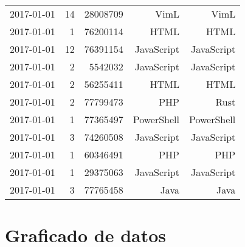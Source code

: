 \begin{table}[htp!]
\begin{tabular}{|r|r|r|r|r|}
		2017-01-01                          & 14                                 & 28008709                         & VimL                                           & VimL                                           \\
		2017-01-01                          & 1                                  & 76200114                         & HTML                                           & HTML                                           \\
		2017-01-01                          & 12                                 & 76391154                         & JavaScript                                     & JavaScript                                     \\
		2017-01-01                          & 2                                  & 5542032                          & JavaScript                                     & JavaScript                                     \\
		2017-01-01                          & 2                                  & 56255411                         & HTML                                           & HTML                                           \\
		2017-01-01                          & 2                                  & 77799473                         & PHP                                            & Rust                                           \\
		2017-01-01                          & 1                                  & 77365497                         & PowerShell                                     & PowerShell                                     \\
		2017-01-01                          & 3                                  & 74260508                         & JavaScript                                     & JavaScript                                     \\
		2017-01-01                          & 1                                  & 60346491                         & PHP                                            & PHP                                            \\
		2017-01-01                          & 1                                  & 29375063                         & JavaScript                                     & JavaScript                                     \\
		2017-01-01                          & 3                                  & 77765458                         & Java                                           & Java                                           \\ \hline
	\end{tabular}
\end{table}

\clearpage
\section{Graficado de datos}
